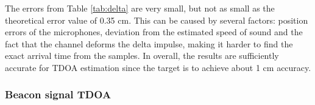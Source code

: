 \documentclass[final]{scrreprt} %
\begin{document}
The errors from Table \ref{tab:delta} are very small, but not as small as the theoretical error value of 0.35 cm.
This can be caused by several factors: position errors of the microphones, deviation from the estimated speed of sound and the fact that the channel deforms the delta impulse, making it harder to find the exact arrival time from the samples.
In overall, the results are sufficiently accurate for TDOA estimation since the target is to achieve about 1 cm accuracy.

\subsubsection{Beacon signal TDOA}
\end{document}
